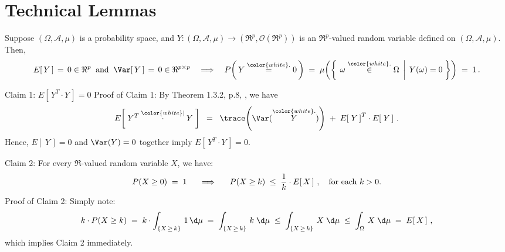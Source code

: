 

\section{Technical Lemmas}
\setcounter{theorem}{0}
\setcounter{equation}{0}

\renewcommand{\theenumi}{\roman{enumi}}
\renewcommand{\labelenumi}{\textnormal{(\theenumi)}$\;\;$}

\begin{lemma}
\label{ZeroExpectationZeroVarImpliesZero}
\mbox{}\vskip 0.1cm
\noindent
Suppose $(\Omega,\mathcal{A},\mu)$ is a probability space, and
$Y : (\Omega,\mathcal{A},\mu) \longrightarrow (\Re^{p},\mathcal{O}(\Re^{p}))$
is an $\Re^{p}$-valued random variable defined on $(\Omega,\mathcal{A},\mu)$.
Then,
\begin{equation*}
E\!\left[\,Y\,\right] \,=\, 0 \in \Re^{p}
\;\;\textnormal{and}\;\;
\Var\!\left[\,Y\,\right] \,=\, 0 \in \Re^{p \times p}
\quad\Longrightarrow\quad
P\!\left(\,Y\overset{{\color{white}.}}{=}0\,\right)
\;=\;
	\mu\!\left(\left\{\;\left.\omega\overset{{\color{white}.}}{\in}\Omega\,\;\right\vert\;Y(\omega) = 0\;\right\}\right)
\;=\;
	1\,.
\end{equation*}
\end{lemma}
\proof
\vskip 0.3cm
\noindent
\textnormal{Claim 1:}\quad
$E\!\left[\,Y^{T}\cdot Y\,\right] = 0$
\vskip 0.3cm
\noindent
Proof of Claim 1:\quad
By Theorem 1.3.2, p.8, \cite{Christensen2011}, we have
\begin{equation*}
E\!\left[\;Y^{T} \overset{{\color{white}\vert}}{\cdot} Y\;\right]
\;\; = \;\;
	\trace\!\left(\Var(\overset{{\color{white}.}}{Y})\right)
	\; + \;
	E\!\left[\;Y\,\right]^{T} \cdot E\!\left[\;Y\,\right]\,.
\end{equation*}
Hence, $E\!\left[\;Y\,\right] = 0$ and $\Var(Y) = 0$ together imply $E\!\left[\,Y^{T}\cdot Y\,\right] = 0$.

\vskip 0.5cm
\noindent
\textnormal{Claim 2:}\quad
For every $\Re$-valued random variable $X$, we have:
\begin{equation*}
P(X \geq 0) \;=\; 1
\quad\;\;\Longrightarrow\quad\;\;
P(X \geq k) \;\leq\; \dfrac{1}{k}\cdot E\!\left[\,X\,\right]\,,
\quad
\textnormal{for each $k > 0$}.
\end{equation*}
Proof of Claim 2:\quad
Simply note:
\begin{equation*}
k \cdot P(X \geq k)
\;=\; k\cdot\int_{\{X\,\geq\,k\}}\,1\,\d\mu
\;=\; \int_{\{X\,\geq\,k\}}\,k\;\d\mu
\;\leq\; \int_{\{X\,\geq\,k\}}\,X\;\d\mu
\;\leq\; \int_{\Omega}\,X\;\d\mu
\;=\; E\!\left[\,X\,\right]\,,
\end{equation*}
which implies Claim 2 immediately.


